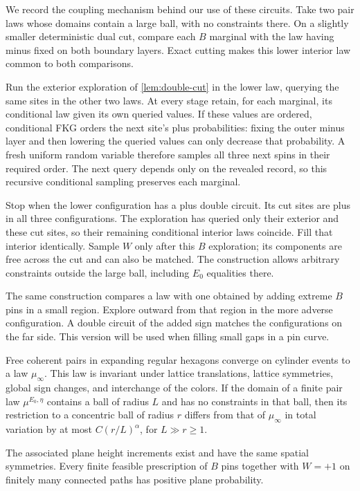 We record the coupling mechanism behind our use of these circuits.  Take
two pair laws whose domains contain a large ball, with no constraints
there.  On a slightly smaller deterministic dual cut, compare each $B$
marginal with the law having minus fixed on both boundary layers.
Exact cutting makes this lower interior law common to both comparisons.

Run the exterior exploration of \cref{lem:double-cut} in the lower law,
querying the same sites in the other two laws.  At every stage retain,
for each marginal, its conditional law given its own queried values.
If these values are ordered, conditional FKG orders the next site's plus
probabilities: fixing the outer minus layer and then lowering the queried
values can only decrease that probability.  A fresh uniform random
variable therefore samples all three next spins in their required order.
The next query depends only on the revealed record, so this recursive
conditional sampling preserves each marginal.

Stop when the lower configuration has a plus double circuit.  Its cut
sites are plus in all three configurations.  The exploration has queried
only their exterior and these cut sites, so their remaining conditional
interior laws coincide.  Fill that interior identically.  Sample $W$ only
after this $B$ exploration; its components are free across the cut and can
also be matched.  The construction allows arbitrary constraints outside
the large ball, including $E_0$ equalities there.

The same construction compares a law with one obtained by adding extreme
$B$ pins in a small region.  Explore outward from that region in the more
adverse configuration.  A double circuit of the added sign matches the
configurations on the far side.  This version will be used when filling
small gaps in a pin curve.

\begin{proposition}
\label{prop:plane-mixing}
Free coherent pairs in expanding regular hexagons converge on cylinder
events to a law $\mu_\infty$.  This law is invariant under lattice
translations, lattice symmetries, global sign changes, and interchange
of the colors.  If the domain of a finite pair law $\mu^{E_0,\eta}$
contains a ball of radius $L$ and has no constraints in that ball, then
its restriction to a concentric
ball of radius $r$ differs from that of $\mu_\infty$ in total variation
by at most $C(r/L)^\alpha$, for $L\gg r\geq1$.

The associated plane height increments exist and have the same spatial
symmetries.  Every finite feasible prescription of $B$ pins together with
$W=+1$ on finitely many connected paths has positive plane probability.
\end{proposition}

